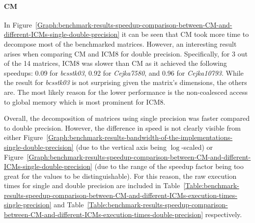 \paragraph{CM}\label{Paragraph:benchmark-results-speedup-comparison-between-CM-and-different-ICMs-CM-speedup-description}
In Figure~\ref{Graph:benchmark-results-speedup-comparison-between-CM-and-different-ICMs-single-double-precision} it can be seen that CM took more time to decompose most of the benchmarked matrices. However, an interesting result arises when comparing CM and ICM8 for double precision. Specifically, for 3 out of the 14 matrices, ICM8 was slower than CM as it achieved the following speedups: 0.09 for \textit{bcsstk03}, 0.92 for \textit{Cejka7580}, and 0.96 for \textit{Cejka10793}. While the result for \textit{bcsstk03} is not surprising given the matrix's dimensions, the others are. The most likely reason for the lower performance is the non-coalesced access to global memory which is most prominent for ICM8.
\par Overall, the decomposition of matrices using single precision was faster compared to double precision. However, the difference in speed is not clearly visible from either Figure~\ref{Graph:benchmark-results-bandwidth-of-the-implementations-single-double-precision} (due to the vertical axis being $ \log $-scaled) or Figure~\ref{Graph:benchmark-results-speedup-comparison-between-CM-and-different-ICMs-single-double-precision} (due to the range of the speedup factor being too great for the values to be distinguishable). For this reason, the raw execution times for single and double precision are included in Table~\ref{Table:benchmark-results-speedup-comparison-between-CM-and-different-ICMs-execution-times-single-precision} and Table~\ref{Table:benchmark-results-speedup-comparison-between-CM-and-different-ICMs-execution-times-double-precision} respectively.

